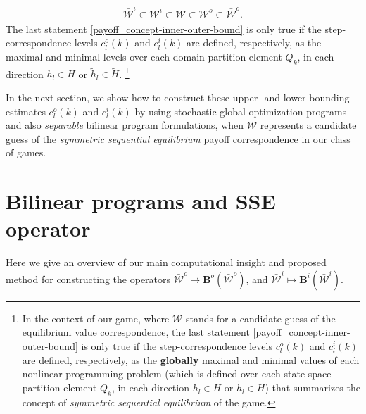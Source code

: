 \documentclass[a4paper,10pt,english]{sphinxmanual}
\begin{document}
\label{payoff_concept:equation-inner-outer-bound}\begin{gather}
\begin{split}        \bar{\mathcal{W}}^i \subset \mathcal{W}^i
        \subset \mathcal{W} \subset \mathcal{W}^o
        \subset \bar{\mathcal{W}}^o.\end{split}\label{payoff_concept-inner-outer-bound}
\end{gather}
The last statement \eqref{payoff_concept-inner-outer-bound} is only true if the step-correspondence levels \(c_{l}^{o}(k)\) and \(c_{l}^{i}(k)\) are defined, respectively, as the maximal and minimal levels over each domain partition element \(Q_k\), in each direction \(h_l \in H\) or \(\tilde{h}_l \in \tilde{H}\). \footnote{
In the context of our game, where \(\mathcal{W}\) stands for a candidate guess of the equilibrium value correspondence, the last statement \eqref{payoff_concept-inner-outer-bound} is only true if the step-correspondence levels \(c_{l}^{o}(k)\) and \(c_{l}^{i}(k)\) are defined, respectively, as the \textbf{globally} maximal and minimal values of each nonlinear programming problem (which is defined over each state-space partition element \(Q_k\), in each direction \(h_l \in H\) or \(\tilde{h}_l \in \tilde{H}\)) that summarizes the concept of \emph{symmetric sequential equilibrium} of the game.
}

In the next section, we show how to construct these upper- and lower
bounding estimates \(c_{l}^{o}(k)\) and \(c_{l}^{i}(k)\) by using
stochastic global optimization programs and also \emph{separable} bilinear program
formulations, when \(\mathcal{W}\) represents a candidate guess of the
\emph{symmetric sequential equilibrium} payoff correspondence in our class of
games.


\chapter{Bilinear programs and SSE operator}
\label{payoff_bilinear::doc}\label{payoff_bilinear:bilinear-programs-and-sse-operator}
Here we give an overview of our main computational insight and proposed method for constructing the operators \(\bar{\mathcal{W}}^o \mapsto \mathbf{B}^{o}(\bar{\mathcal{W}}^o)\), and \(\bar{\mathcal{W}}^i \mapsto \mathbf{B}^{i}(\bar{\mathcal{W}}^i)\).
\end{document}
